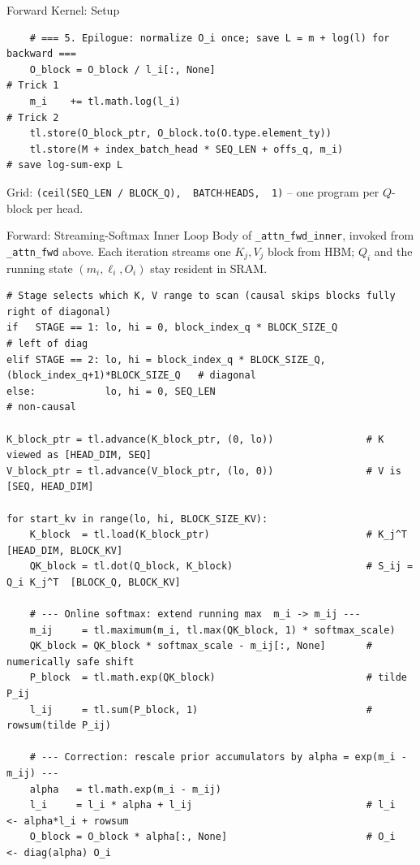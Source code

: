 \begin{frame}[fragile]{Forward Kernel: Setup}
\begin{lstlisting}
    # === 5. Epilogue: normalize O_i once; save L = m + log(l) for backward ===
    O_block = O_block / l_i[:, None]                                  # Trick 1
    m_i    += tl.math.log(l_i)                                        # Trick 2
    tl.store(O_block_ptr, O_block.to(O.type.element_ty))
    tl.store(M + index_batch_head * SEQ_LEN + offs_q, m_i)            # save log-sum-exp L
\end{lstlisting}

  \vspace{-0.3em}
  {\footnotesize Grid: \texttt{(ceil(SEQ\_LEN / BLOCK\_Q),\, BATCH$\cdot$HEADS,\, 1)} -- one program per $Q$-block per head.}
\end{frame}

\begin{frame}[fragile]{Forward: Streaming-Softmax Inner Loop}
  Body of \texttt{\_attn\_fwd\_inner}, invoked from \texttt{\_attn\_fwd} above. Each
  iteration streams one $K_j, V_j$ block from HBM; $Q_i$ and the running state
  $(m_i, \ell_i, O_i)$ stay resident in SRAM.

\begin{lstlisting}
# Stage selects which K, V range to scan (causal skips blocks fully right of diagonal)
if   STAGE == 1: lo, hi = 0, block_index_q * BLOCK_SIZE_Q                                # left of diag
elif STAGE == 2: lo, hi = block_index_q * BLOCK_SIZE_Q, (block_index_q+1)*BLOCK_SIZE_Q   # diagonal
else:            lo, hi = 0, SEQ_LEN                                                     # non-causal

K_block_ptr = tl.advance(K_block_ptr, (0, lo))                # K viewed as [HEAD_DIM, SEQ]
V_block_ptr = tl.advance(V_block_ptr, (lo, 0))                # V is        [SEQ, HEAD_DIM]

for start_kv in range(lo, hi, BLOCK_SIZE_KV):
    K_block  = tl.load(K_block_ptr)                           # K_j^T  [HEAD_DIM, BLOCK_KV]
    QK_block = tl.dot(Q_block, K_block)                       # S_ij = Q_i K_j^T  [BLOCK_Q, BLOCK_KV]

    # --- Online softmax: extend running max  m_i -> m_ij ---
    m_ij     = tl.maximum(m_i, tl.max(QK_block, 1) * softmax_scale)
    QK_block = QK_block * softmax_scale - m_ij[:, None]       # numerically safe shift
    P_block  = tl.math.exp(QK_block)                          # tilde P_ij
    l_ij     = tl.sum(P_block, 1)                             # rowsum(tilde P_ij)

    # --- Correction: rescale prior accumulators by alpha = exp(m_i - m_ij) ---
    alpha   = tl.math.exp(m_i - m_ij)
    l_i     = l_i * alpha + l_ij                              # l_i  <- alpha*l_i + rowsum
    O_block = O_block * alpha[:, None]                        # O_i  <- diag(alpha) O_i


\end{lstlisting}
\end{frame}
